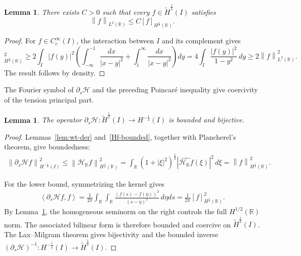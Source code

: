 \documentclass[11pt,reqno]{amsart}
\theoremstyle{plain}
\newtheorem{lemma}[theorem]{Lemma}
\theoremstyle{definition}
\numberwithin{equation}{section}
\newcommand{\paren}[1]{\left(#1\right)}
\newcommand{\p}{\partial}
\newcommand{\mc}[1]{\mathcal{#1}}
\newcommand{\wh}[1]{\widehat{#1}}
\newcommand{\wt}[1]{\widetilde{#1}}
\newcommand{\abs}[1]{\left\lvert #1 \right\rvert}
\newcommand{\norm}[1]{\left\lVert #1 \right\rVert}
\newcommand{\dual}[2]{\left\langle #1,#2 \right\rangle}
\newcommand{\R}{\mathbb{R}}
\newcommand{\thi}[1]{\wt H^{#1}(I)}
\newcommand{\hr}[1]{H^{#1}(\R)}
\begin{document}
\begin{lemma}\label{lem:frac-poincare}
There exists $C>0$ such that every $f\in\thi{\frac{1}{2}}$ satisfies
\begin{equation}
    \norm{f}_{L^2(\R)}\le C[f]_{\hr{\frac{1}{2}}}.
\end{equation}
\end{lemma}
\begin{proof}
For $f\in C_c^\infty(I)$, the interaction between $I$ and its complement
gives
\begin{equation}
    [f]_{\hr{\frac{1}{2}}}^2 \ge 2\int_I\abs{f(y)}^2 \left(\int_{-\infty}^{-1}\frac{dx}{\abs{x-y}^2}
    +\int_1^\infty\frac{dx}{\abs{x-y}^2}\right)dy =4\int_I\frac{\abs{f(y)}^2}{1-y^2}\,dy \ge
    2\norm{f}_{L^2(\R)}^2.
\end{equation}
The result follows by density.
\end{proof}

The Fourier symbol of $\p_s\mc H$ and the preceding Poincar\'e inequality
give coercivity of the tension principal part.

\begin{lemma}\label{ds-H-biject}
The operator
$\p_s\mc H:\thi{\frac{1}{2}}\to H^{-\frac{1}{2}}(I)$ is bounded and
bijective.
\end{lemma}
\begin{proof}
Lemmas~\ref{lem:wt-der} and~\ref{Hf-bounded}, together with Plancherel's
theorem, give boundedness:
\begin{equation}
\begin{aligned}
    \norm{\p_s\mc Hf}_{H^{-\frac{1}{2}}(I)}^2
    \le \norm{\mc H_{\R}f}_{\hr{\frac{1}{2}}}^2  =\int_\R\paren{1+\abs{\xi}^2}^{\frac12}
    \abs{\wh{\mc H_{\R}f}(\xi)}^2\,d\xi
    =\norm{f}_{\hr{\frac{1}{2}}}^2.
\end{aligned}
\end{equation}

For the lower bound, symmetrizing the kernel gives
\begin{equation}\label{eqn:dsh-coer}
\begin{aligned}
    \dual{\p_s\mc Hf}{f}
    =\frac{1}{2\pi}\int_\R\int_\R
    \frac{\paren{f(s)-f(\eta)}^2}{\paren{s-\eta}^2}\,d\eta ds =\frac{1}{2\pi}[f]_{\hr{\frac{1}{2}}}^2.
\end{aligned}
\end{equation}
By Lemma~\ref{lem:frac-poincare}, the homogeneous seminorm on the right
controls the full $H^{1/2}(\R)$ norm. The associated bilinear form is
therefore bounded and coercive on $\thi{\frac{1}{2}}$. The Lax--Milgram
theorem gives bijectivity and the bounded inverse
$(\p_s\mc H)^{-1}:H^{-\frac{1}{2}}(I)\to\thi{\frac{1}{2}}$.
\end{proof}
\end{document}
